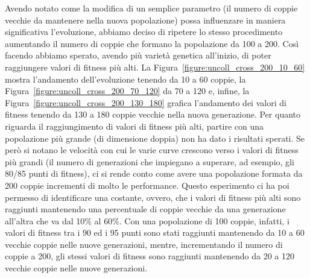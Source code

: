 Avendo notato come la modifica di un semplice parametro (il numero di coppie
vecchie da mantenere nella nuova popolazione) possa influenzare in maniera
significativa l'evoluzione, abbiamo deciso di ripetere lo stesso procedimento
aumentando il numero di coppie che formano la popolazione da 100 a 200. Così
facendo abbiamo sperato, avendo più varietà genetica all'inizio, di poter
raggiungere valori di fitness più alti.\newline
La Figura~\ref{figure:uncoll_cross_200_10_60} mostra l'andamento dell'evoluzione
tenendo da 10 a 60 coppie, la Figura~\ref{figure:uncoll_cross_200_70_120} da 70
a 120 e, infine, la Figura~\ref{figure:uncoll_cross_200_130_180} grafica
l'andamento dei valori di fitness tenendo da 130 a 180 coppie vecchie nella
nuova generazione.\newline
Per quanto riguarda il raggiungimento di valori di fitness più alti, partire
con una popolazione più grande (di dimensione doppia) non ha dato i risultati
sperati. Se però si notano le velocità con cui le varie curve crescono verso i
valori di fitness più grandi (il numero di generazioni che impiegano a superare,
ad esempio, gli 80/85 punti di fitness), ci si rende conto come avere una
popolazione formata da 200 coppie incrementi di molto le performance.\newline
Questo esperimento ci ha poi permesso di identificare una costante, ovvero, che
i valori di fitness più alti sono raggiunti mantenendo una percentuale
di coppie vecchie da una generazione all'altra che va dal 10\% al 60\%. Con una
popolazione di 100 coppie, infatti, i valori di fitness tra i 90 ed i 95 punti
sono stati raggiunti mantenendo da 10 a 60 vecchie coppie nelle nuove
generazioni, mentre, incrementando il numero di coppie a 200, gli stessi valori
di fitness sono raggiunti mantenendo da 20 a 120 vecchie coppie nelle nuove
generazioni.

\clearpage

